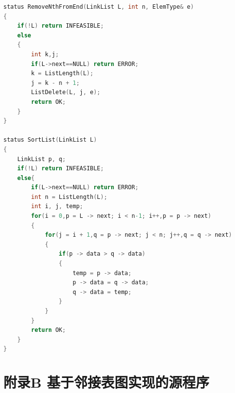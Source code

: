 \documentclass[supercite]{Experimental_Report}
\theoremstyle{definition}
\begin{document}
\begin{lstlisting}[language=C]
status RemoveNthFromEnd(LinkList L, int n, ElemType& e)
{
	if(!L) return INFEASIBLE;
	else
	{
		int k,j; 
		if(L->next==NULL) return ERROR;
		k = ListLength(L);
		j = k - n + 1;
		ListDelete(L, j, e);
		return OK;
	}
}

status SortList(LinkList L)
{
	LinkList p, q;
	if(!L) return INFEASIBLE;
	else{
		if(L->next==NULL) return ERROR;
		int n = ListLength(L);
		int i, j, temp;
		for(i = 0,p = L -> next; i < n-1; i++,p = p -> next)
		{
			for(j = i + 1,q = p -> next; j < n; j++,q = q -> next)
			{
				if(p -> data > q -> data)
				{
					temp = p -> data;
					p -> data = q -> data;
					q -> data = temp;
				}
			}
		}
		return OK;
	}
}
\end{lstlisting}
\newpage
\section{附录B 基于邻接表图实现的源程序}
\end{document}
